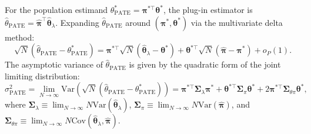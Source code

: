 \documentclass[twoside]{article}
\theoremstyle{definition}
\newcommand{\Var}{\mathrm{Var}}
\newcommand{\Cov}{\mathrm{Cov}}
\begin{document}
For the population estimand $\theta_{\mathrm{PATE}}^* = \boldsymbol{\pi}^{*\top} \boldsymbol{\theta}^*$, the plug-in estimator is $\hat{\theta}_{\mathrm{PATE}} = \hat{\boldsymbol{\pi}}^\top \hat{\boldsymbol{\theta}}_\lambda$. Expanding $\hat{\theta}_{\mathrm{PATE}}$ around $(\boldsymbol{\pi}^*, \boldsymbol{\theta}^*)$ via the multivariate delta method:
\begin{equation}
    \sqrt{N}\left( \hat{\theta}_{\mathrm{PATE}} - \theta_{\mathrm{PATE}}^* \right) = \boldsymbol{\pi}^{*\top} \sqrt{N}\left( \hat{\boldsymbol{\theta}}_\lambda - \boldsymbol{\theta}^* \right) + \boldsymbol{\theta}^{*\top} \sqrt{N}\left( \hat{\boldsymbol{\pi}} - \boldsymbol{\pi}^* \right) + o_P(1).
\end{equation}
The asymptotic variance of $\hat{\theta}_{\mathrm{PATE}}$ is given by the quadratic form of the joint limiting distribution:
\begin{equation}
    \sigma_{\mathrm{PATE}}^2 = \lim_{N \to \infty} \Var\left( \sqrt{N}(\hat{\theta}_{\mathrm{PATE}} - \theta_{\mathrm{PATE}}^*) \right) = \boldsymbol{\pi}^{*\top} \boldsymbol{\Sigma}_\lambda \boldsymbol{\pi}^* + \boldsymbol{\theta}^{*\top} \boldsymbol{\Sigma}_\pi \boldsymbol{\theta}^* + 2 \boldsymbol{\pi}^{*\top} \boldsymbol{\Sigma}_{\theta\pi} \boldsymbol{\theta}^*,
\end{equation}
where $\boldsymbol{\Sigma}_\lambda \equiv \lim_{N \to \infty} N \Var(\hat{\boldsymbol{\theta}}_\lambda)$, $\boldsymbol{\Sigma}_\pi \equiv \lim_{N \to \infty} N \Var(\hat{\boldsymbol{\pi}})$, and $\boldsymbol{\Sigma}_{\theta\pi} \equiv \lim_{N \to \infty} N \Cov(\hat{\boldsymbol{\theta}}_\lambda, \hat{\boldsymbol{\pi}})$.
\end{document}
